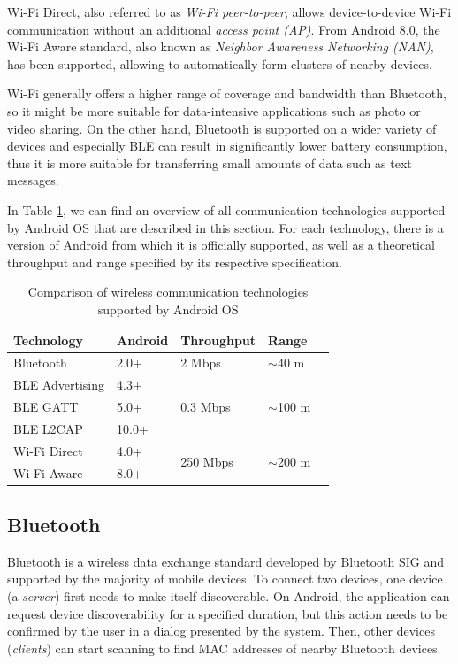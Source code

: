 \documentclass[conference,compsoc]{IEEEtran}
\begin{document}
Wi-Fi Direct, also referred to as \textit{Wi-Fi peer-to-peer}, allows device-to-device Wi-Fi communication without an additional \textit{access point (AP)}. From Android 8.0, the Wi-Fi Aware  standard, also known as \textit{Neighbor Awareness Networking (NAN)}, has been supported, allowing to automatically form clusters of nearby devices.

Wi-Fi generally offers a higher range of coverage and bandwidth than Bluetooth, so it might be more suitable for data-intensive applications such as photo or video sharing. On the other hand, Bluetooth is supported on a wider variety of devices and especially BLE can result in significantly lower battery consumption, thus it is more suitable for transferring small amounts of data such as text messages.

In Table \ref{wirelesstech_table}, we can find an overview of all communication technologies supported by Android OS that are described in this section. For each technology, there is a version of Android from which it is officially supported, as well as a theoretical throughput and range specified by its respective specification.

\begin{table}
  \centering
  \begin{tabular}{ | l | l | l | l | l | }
    \hline
    Technology & Android & Throughput & Range \\
    \hline
    Bluetooth & 2.0+ & 2 Mbps & $\sim$40 m \\
    \hline
    BLE Advertising & 4.3+ & \multirow{3}{*}{0.3 Mbps} & \multirow{3}{*}{$\sim$100 m} \\
    BLE GATT & 5.0+ &  &  \\
    BLE L2CAP & 10.0+ &  &  \\
    \hline
    Wi-Fi Direct & 4.0+ & \multirow{2}{*}{250 Mbps} & \multirow{2}{*}{$\sim$200 m} \\
    Wi-Fi Aware & 8.0+ & & \\
    \hline
  \end{tabular}
  \caption{Comparison of wireless communication technologies supported by Android OS %
  }
  \label{wirelesstech_table}
\end{table}


\subsection{Bluetooth}\label{bluetooth}
Bluetooth is a wireless data exchange standard developed by Bluetooth SIG and supported by the majority of mobile devices. To connect two devices, one device
 (a \textit{server}) first needs to make itself discoverable. On Android, the application can request device discoverability for a specified duration, but this action needs to be confirmed by the user in a dialog presented by the system. Then, other devices (\textit{clients}) can start scanning to find MAC addresses of nearby Bluetooth devices.
\end{document}
